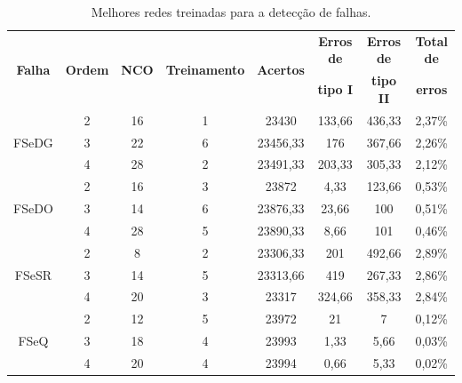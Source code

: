 \begin{table}[!htb]
\centering
\small
\caption{Melhores redes treinadas para a detecção de falhas.}
\vspace{0.25cm}
\label{tab:melhores_redes_detec}
\begin{tabular}{|c|c|c|c|c|c|c|c|}
\hline
\multirow{2}{*}{\bf Falha} &
\multirow{2}{*}{\bf Ordem} &
\multirow{2}{*}{\bf NCO} &
\multirow{2}{*}{\bf Treinamento} &
\multirow{2}{*}{\bf Acertos} &
{\bf Erros de} & {\bf Erros de} & {\bf Total de}\\
& & & & & {\bf tipo I} & {\bf tipo II} & {\bf erros}\\
\hline
\hline
\multirow{3}{*}{FSeDG} &
2 & 16 & 1 & 23430 & 133,66 & 436,33 & 2,37\%\\
\cline{2-8}
& 3 & 22 & 6 & 23456,33 & 176 & 367,66 & 2,26\%\\
\hhline{~-------}
& 
\cellcolor[gray]{0.85}4 & 
\cellcolor[gray]{0.85}28 & 
\cellcolor[gray]{0.85}2 &
\cellcolor[gray]{0.85}23491,33 & 
\cellcolor[gray]{0.85}203,33 & 
\cellcolor[gray]{0.85}305,33 & 
\cellcolor[gray]{0.85}2,12\%\\
\hline
\multirow{3}{*}{FSeDO} &
2 & 16 & 3 & 23872 & 4,33 & 123,66 & 0,53\%\\
\cline{2-8}
& 3 & 14 & 6 & 23876,33 & 23,66 & 100 & 0,51\%\\
\hhline{~-------}
& 
\cellcolor[gray]{0.85}4 & 
\cellcolor[gray]{0.85}28 & 
\cellcolor[gray]{0.85}5 & 
\cellcolor[gray]{0.85}23890,33 & 
\cellcolor[gray]{0.85}8,66 & 
\cellcolor[gray]{0.85}101 & 
\cellcolor[gray]{0.85}0,46\%\\
\hline
\multirow{3}{*}{FSeSR} &
2 & 8 & 2 & 23306,33 & 201 & 492,66 & 2,89\%\\
\cline{2-8}
& 3 & 14 & 5 & 23313,66 & 419 & 267,33 & 2,86\%\\
\hhline{~-------}
& 
\cellcolor[gray]{0.85}4 & 
\cellcolor[gray]{0.85}20 & 
\cellcolor[gray]{0.85}3 & 
\cellcolor[gray]{0.85}23317 & 
\cellcolor[gray]{0.85}324,66 & 
\cellcolor[gray]{0.85}358,33 & 
\cellcolor[gray]{0.85}2,84\%\\
\hline
\multirow{3}{*}{FSeQ} &
2 & 12 & 5 & 23972 & 21 & 7 & 0,12\%\\
\cline{2-8}
& 3 & 18 & 4 & 23993 & 1,33 & 5,66 & 0,03\%\\
\hhline{~-------}
& 
\cellcolor[gray]{0.85}4 & 
\cellcolor[gray]{0.85}20 & 
\cellcolor[gray]{0.85}4 & 
\cellcolor[gray]{0.85}23994 & 
\cellcolor[gray]{0.85}0,66 & 
\cellcolor[gray]{0.85}5,33 & 
\cellcolor[gray]{0.85}0,02\%\\
\hline

\end{tabular}
\end{table}
